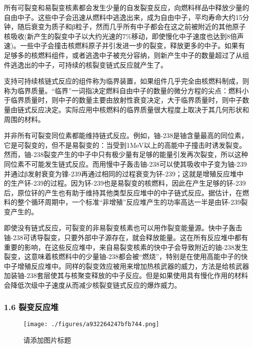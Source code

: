 所有可裂变和易裂变核素都会发生少量的自发裂变反应，向燃料样品中释放少量的自由中子。这些中子会迅速从燃料中逃逸出来，成为自由中子，平均寿命大约15分钟，随后衰变为质子和β粒子，然而几乎所有中子都会在这之前被附近的其他原子核吸收(新产生的裂变中子以大约光速的7\%移动，即使慢化中子速度也达到8倍声速)。一些中子会撞击核燃料原子并引发进一步的裂变，释放更多的中子。如果有足够多的核燃料组件，或者逃逸中子被充分容纳，则新产生中子的数量超过了从组件逃逸出的中子，可持续的核裂变链式反应就产生了。

支持可持续核链式反应的组件称为临界装置，如果组件几乎完全由核燃料制成，则称为临界质量。“临界”一词指决定燃料自由中子的数量的微分方程的尖点：燃料小于临界质量时，则中子的数量主要由放射性衰变决定，大于临界质量时，则中子数量由链式反应决定。实际应用中核燃料的临界质量很大程度上取决于其几何形状和周围的材料。

并非所有可裂变同位素都能维持链式反应。例如，铀-238是铀含量最高的同位素，它是可裂变的，但不是易裂变的：当受到1MeV以上的高能中子撞击时诱发裂变。然而，铀-238裂变产生的中子中只有极少量有足够的能量引发再次裂变，所以这种同位素不可能发生链式反应。而用慢中子轰击铀-238可以使其吸收中子变为铀-239并通过β发射衰变为镎-239再通过相同的过程衰变为钚-239；这就是增殖反应堆中的生产钚-239的过程。因为钚-239也是易裂变的核燃料，因此在产生足够的钚-239后，原位钚的产生也有助于维持其他类型反应堆中的中子链式反应。据估计，在燃料的整个循环周期中，一个标准“非增殖”反应堆产生的功率高达一半是由钚-239裂变产生的。

即使没有链式反应，可裂变的非易裂变核素也可以用作裂变能量源。快中子轰击铀-238可诱导裂变，只要外部中子源存在，就会释放能量。这在所有反应堆中都有重要的影响，在这些反应堆中，来自易裂变核素的快中子会导致附近的铀-238发生裂变，这意味着核燃料中的少量铀-238都会被“燃烧”，特别是在使用高能中子的快中子增殖反应堆中。同样的裂变效应被用来增加热核武器的威力，方法是给核武器加装铀-238套层使其与核聚变释放的中子反应。但是如果使用具有慢化作用的材料会降低次级中子速度从而减少核裂变链式反应的爆炸威力。

\subsubsection{1.6 裂变反应堆}
\begin{figure}[ht]
\centering
\texttt{[image: ./figures/a932264247bfb744.png]}
\caption{请添加图片标题} \label{fig_HLB_7}
\end{figure}
